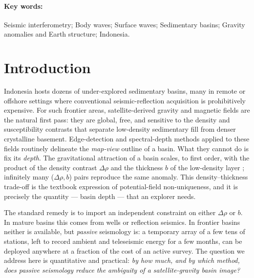 \paragraph{Key words:} Seismic interferometry; Body waves; Surface waves;
Sedimentary basins; Gravity anomalies and Earth structure; Indonesia.

\section{Introduction}
Indonesia hosts dozens of under-explored sedimentary basins, many in remote or
offshore settings where conventional seismic-reflection acquisition is
prohibitively expensive. For such frontier areas, satellite-derived gravity and
magnetic fields \citep{Pavlis2012,Sandwell2014,Balmino2012} are the natural first
pass: they are global, free, and sensitive to the density and susceptibility
contrasts that separate low-density sedimentary fill from denser crystalline
basement. Edge-detection and spectral-depth methods applied to these fields
routinely delineate the \emph{map-view} outline of a basin. What they cannot do
is fix its \emph{depth}. The gravitational attraction of a basin scales, to first
order, with the product of the density contrast $\Delta\rho$ and the thickness
$b$ of the low-density layer \citep{Bott1960}; infinitely many
($\Delta\rho,b$) pairs reproduce the same anomaly. This density--thickness
trade-off is the textbook expression of potential-field non-uniqueness, and it is
precisely the quantity --- basin depth --- that an explorer needs.

The standard remedy is to import an independent constraint on either $\Delta\rho$
or $b$. In mature basins this comes from wells or reflection seismics. In frontier
basins neither is available, but \emph{passive} seismology is: a temporary array
of a few tens of stations, left to record ambient and teleseismic energy for a few
months, can be deployed anywhere at a fraction of the cost of an active survey.
The question we address here is quantitative and practical: \emph{by how much, and
by which method, does passive seismology reduce the ambiguity of a
satellite-gravity basin image?}


